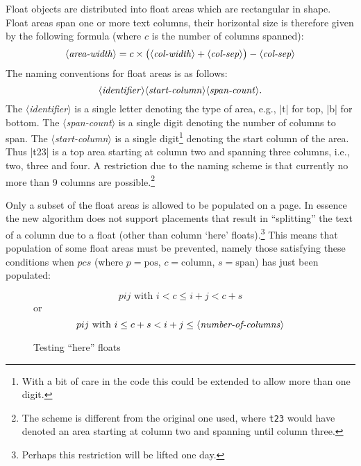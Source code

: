 \documentclass[twocolumn]{article}
\newcommand\meta[1]{\mbox{$\langle$\textit{#1}$\rangle$}}
\begin{document}
Float objects are distributed into float areas which are
rectangular in shape. Float areas span one or more text columns, their
horizontal size is therefore given by the following formula (where
$c$ is the number of columns spanned):
\[
   \meta{area-width} =  c \times 
                        \bigl( \meta{col-width} + \meta{col-sep}\bigr)
                        - \meta{col-sep}
\]
The naming conventions for float areas is as follows:
\[
\meta{identifier}\meta{start-column}\meta{span-count}.
\]
The \meta{identifier} is a single letter denoting the type of area,
e.g., |t| for top, |b| for bottom. The \meta{span-count} is a single
digit denoting the number of columns to span. The
\meta{start-column} is a single digit\footnote{With a bit of care in
the code this could be extended to allow more than one digit.}
denoting the start column of the area. Thus |t23| is a top area
starting at column two and spanning three columns, i.e., two, three 
and four.
A restriction due to the naming scheme is that currently no more than
9 columns are possible.\footnote{The scheme is different from the
original one used, where \texttt{t23} would have denoted an area
starting at column two and spanning until column three.}

Only a subset of the float areas is allowed to be populated on a
page. In essence the new algorithm does not support placements
that result in ``splitting'' the text of a column due to a float (other
than column `here' floats).\footnote{Perhaps this restriction will be
lifted one day.} This means that population of some float areas
must be prevented, namely those satisfying these conditions
when $pcs$ (where $p=\textrm{pos}$, 
$c=\textrm{column}$, $s=\textrm{span}$) has just been populated:
\begin{figure}[h]
\begin{minipage}{\columnwidth}
\vspace*{-2\baselineskip}
\tiny %
\[
   pij  \textrm{ with }   i < c \leq i+j < c+s
\]
or
\[
   pij  \textrm{ with }   i \leq c+s < i+j \leq 
                            \mbox{\meta{number-of-columns}}
\]
\end{minipage}
\caption{Testing ``here'' floats}
\end{figure}
\end{document}
